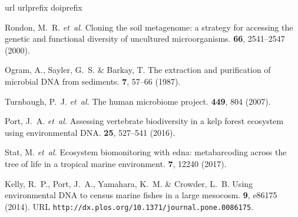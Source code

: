 \documentclass[fleqn,11pt,lineno]{wlscirep}
\begin{document}
\begin{thebibliography}{10}
\expandafter\ifx\csname url\endcsname\relax
  \def\url#1{\texttt{#1}}\fi
\expandafter\ifx\csname urlprefix\endcsname\relax\def\urlprefix{URL }\fi
\expandafter\ifx\csname doiprefix\endcsname\relax\def\doiprefix{DOI }\fi
\providecommand{\bibinfo}[2]{#2}
\providecommand{\eprint}[2][]{\url{#2}}

\bibinfo{author}{Rondon, M.~R.} \emph{et~al.}
\newblock \bibinfo{journal}{\bibinfo{title}{Cloning the soil metagenome: a
  strategy for accessing the genetic and functional diversity of uncultured
  microorganisms}}.
  \textbf{\bibinfo{volume}{66}}, \bibinfo{pages}{2541--2547}
  (\bibinfo{year}{2000}).

\bibinfo{author}{Ogram, A.}, \bibinfo{author}{Sayler, G.~S.} \&
  \bibinfo{author}{Barkay, T.}
\newblock \bibinfo{journal}{\bibinfo{title}{The extraction and purification of
  microbial {DNA} from sediments}}.
  \textbf{\bibinfo{volume}{7}}, \bibinfo{pages}{57--66} (\bibinfo{year}{1987}).

\bibinfo{author}{Turnbaugh, P.~J.} \emph{et~al.}
\newblock \bibinfo{journal}{\bibinfo{title}{The human microbiome project}}.
 \textbf{\bibinfo{volume}{449}},
  \bibinfo{pages}{804} (\bibinfo{year}{2007}).

\bibinfo{author}{Port, J.~A.} \emph{et~al.}
\newblock \bibinfo{journal}{\bibinfo{title}{Assessing vertebrate biodiversity
  in a kelp forest ecosystem using environmental {DNA}}}.
  \textbf{\bibinfo{volume}{25}}, \bibinfo{pages}{527--541}
  (\bibinfo{year}{2016}).

\bibinfo{author}{Stat, M.} \emph{et~al.}
\newblock \bibinfo{journal}{\bibinfo{title}{Ecosystem biomonitoring with edna:
  metabarcoding across the tree of life in a tropical marine environment}}.
  \textbf{\bibinfo{volume}{7}}, \bibinfo{pages}{12240} (\bibinfo{year}{2017}).

\bibinfo{author}{Kelly, R.~P.}, \bibinfo{author}{Port, J.~A.},
  \bibinfo{author}{Yamahara, K.~M.} \& \bibinfo{author}{Crowder, L.~B.}
\newblock \bibinfo{journal}{\bibinfo{title}{Using environmental {DNA} to census
  marine fishes in a large mesocosm}}.
 \textbf{\bibinfo{volume}{9}},
  \bibinfo{pages}{e86175} (\bibinfo{year}{2014}).
\newblock \urlprefix\url{http://dx.plos.org/10.1371/journal.pone.0086175}.


\end{thebibliography}
\end{document}

